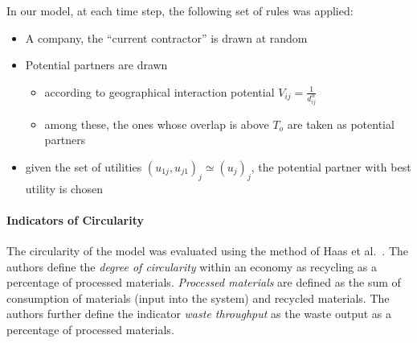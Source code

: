 \documentclass[fleqn,10pt]{wlscirep}
\begin{document}
In our model, at each time step, the following set of rules was applied:
\begin{itemize}
\item A company, the ``current contractor'' is drawn at random %
\item Potential partners are drawn
\begin{itemize}
\item according to geographical interaction potential $V_{ij}=\frac{1}{d_{ij}^{\alpha}}$
\item among these, the ones whose overlap is above $T_o$ are taken as potential partners
\end{itemize}
\item given the set of utilities $(u_{1j},u_{j1})_j \simeq (u_j)_j$, the potential partner with best utility is chosen
\end{itemize}




\paragraph*{Indicators of Circularity}


The circularity of the model was evaluated using the method of Haas et al.~\cite{haas2015circular}. The authors define the \textit{degree of circularity} within an economy as recycling as a percentage of processed materials. \textit{Processed materials} are defined as the sum of consumption of materials (input into the system) and recycled materials. The authors further define the indicator \textit{waste throughput} as the waste output as a percentage of processed materials. 
\end{document}
